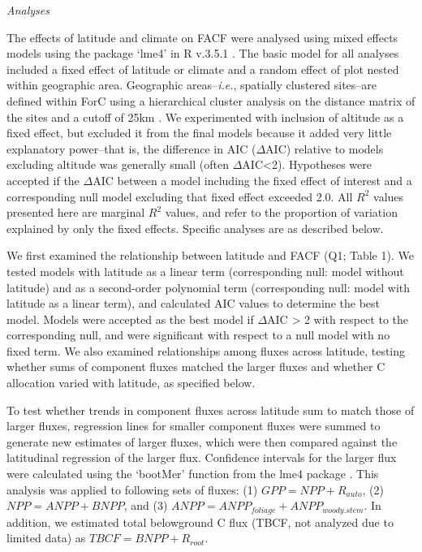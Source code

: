 \documentclass[]{article}
\begin{document}
\emph{Analyses}

The effects of latitude and climate on FACF were analysed using mixed
effects models using the package `lme4' \citep{bates_fitting_2015} in R
v.3.5.1 \citep{r_core_team_r:_2018}. The basic model for all analyses
included a fixed effect of latitude or climate and a random effect of
plot nested within geographic area. Geographic areas--\emph{i.e.},
spatially clustered sites--are defined within ForC using a hierarchical
cluster analysis on the distance matrix of the sites and a cutoff of
25km \citep{anderson-teixeira_forc_2018}. We experimented with inclusion
of altitude as a fixed effect, but excluded it from the final models
because it added very little explanatory power--that is, the difference
in AIC (\(\Delta\)AIC) relative to models excluding altitude was
generally small (often \(\Delta\)AIC\textless{}2). Hypotheses were
accepted if the \(\Delta\)AIC between a model including the fixed effect
of interest and a corresponding null model excluding that fixed effect
exceeded 2.0. All \(R^2\) values presented here are marginal \(R^2\)
values, and refer to the proportion of variation explained by only the
fixed effects. Specific analyses are as described below.

We first examined the relationship between latitude and FACF (Q1; Table
1). We tested models with latitude as a linear term (corresponding null:
model without latitude) and as a second-order polynomial term
(corresponding null: model with latitude as a linear term), and
calculated AIC values to determine the best model. Models were accepted
as the best model if \(\Delta\)AIC \textgreater{} 2 with respect to the
corresponding null, and were significant with respect to a null model
with no fixed term. We also examined relationships among fluxes across
latitude, testing whether sums of component fluxes matched the larger
fluxes and whether C allocation varied with latitude, as specified
below.

To test whether trends in component fluxes across latitude sum to match
those of larger fluxes, regression lines for smaller component fluxes
were summed to generate new estimates of larger fluxes, which were then
compared against the latitudinal regression of the larger flux.
Confidence intervals for the larger flux were calculated using the
`bootMer' function from the lme4 package \citep{bates_fitting_2015}.
This analysis was applied to following sets of fluxes: (1)
\(GPP = NPP + R_{auto}\), (2) \(NPP = ANPP + BNPP\), and (3)
\(ANPP = ANPP_{foliage} + ANPP_{woody.stem}\). In addition, we estimated
total belowground C flux (TBCF, not analyzed due to limited data) as
\(TBCF = BNPP + R_{root}\).
\end{document}
